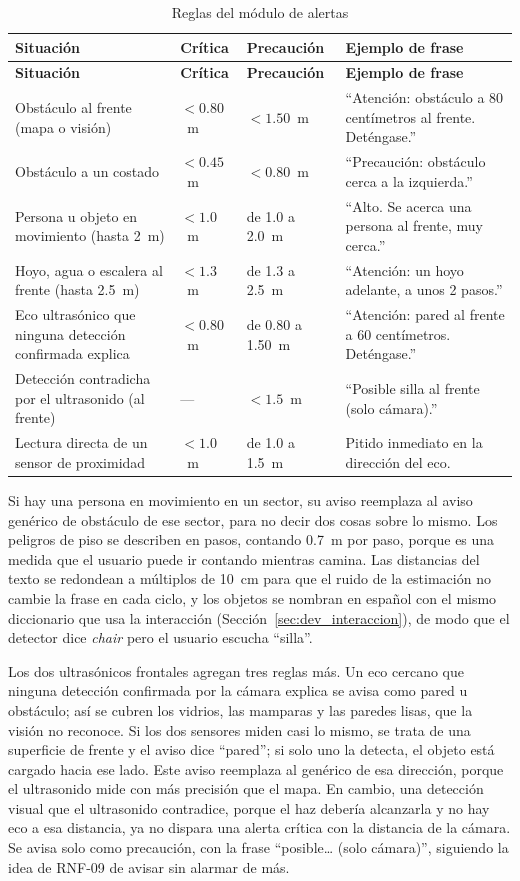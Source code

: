 \begin{longtable}{|p{3.4cm}|p{3.6cm}|p{3.2cm}|p{4.3cm}|}
\caption{Reglas del módulo de alertas}
\label{tab:alertas_reglas} \\
\hline
\textbf{Situación} & \textbf{Crítica} & \textbf{Precaución} & \textbf{Ejemplo de
frase} \\
\hline
\endfirsthead
\hline
\textbf{Situación} & \textbf{Crítica} & \textbf{Precaución} & \textbf{Ejemplo de
frase} \\
\hline
\endhead
Obstáculo al frente (mapa o visión) & $< 0.80$~m & $< 1.50$~m & ``Atención:
obstáculo a 80 centímetros al frente. Deténgase.'' \\
\hline
Obstáculo a un costado & $< 0.45$~m & $< 0.80$~m & ``Precaución: obstáculo cerca a
la izquierda.'' \\
\hline
Persona u objeto en movimiento (hasta 2~m) & $< 1.0$~m & de 1.0 a 2.0~m & ``Alto. Se
acerca una persona al frente, muy cerca.'' \\
\hline
Hoyo, agua o escalera al frente (hasta 2.5~m) & $< 1.3$~m & de 1.3 a 2.5~m &
``Atención: un hoyo adelante, a unos 2 pasos.'' \\
\hline
Eco ultrasónico que ninguna detección confirmada explica & $< 0.80$~m & de 0.80 a
1.50~m & ``Atención: pared al frente a 60 centímetros. Deténgase.'' \\
\hline
Detección contradicha por el ultrasonido (al frente) & --- & $< 1.5$~m & ``Posible
silla al frente (solo cámara).'' \\
\hline
Lectura directa de un sensor de proximidad & $< 1.0$~m & de 1.0 a 1.5~m & Pitido
inmediato en la dirección del eco. \\
\hline
\end{longtable}

Si hay una persona en movimiento en un sector, su aviso reemplaza al aviso genérico de
obstáculo de ese sector, para no decir dos cosas sobre lo mismo. Los peligros de piso se
describen en pasos, contando 0.7~m por paso, porque es una medida que el usuario puede
ir contando mientras camina. Las distancias del texto se redondean a múltiplos de
10~cm para que el ruido de la estimación no cambie la frase en cada ciclo, y los objetos
se nombran en español con el mismo diccionario que usa la interacción
(Sección~\ref{sec:dev_interaccion}), de modo que el detector dice \emph{chair} pero el
usuario escucha ``silla''.

Los dos ultrasónicos frontales agregan tres reglas más. Un eco cercano que ninguna
detección confirmada por la cámara explica se avisa como pared u obstáculo; así se
cubren los vidrios, las mamparas y las paredes lisas, que la visión no reconoce. Si los
dos sensores miden casi lo mismo, se trata de una superficie de frente y el aviso dice
``pared''; si solo uno la detecta, el objeto está cargado hacia ese lado. Este aviso
reemplaza al genérico de esa dirección, porque el ultrasonido mide con más precisión que
el mapa. En cambio, una detección visual que el ultrasonido contradice, porque el haz
debería alcanzarla y no hay eco a esa distancia, ya no dispara una alerta crítica con la
distancia de la cámara. Se avisa solo como precaución, con la frase ``posible\dots{}
(solo cámara)'', siguiendo la idea de RNF-09 de avisar sin alarmar de más.

